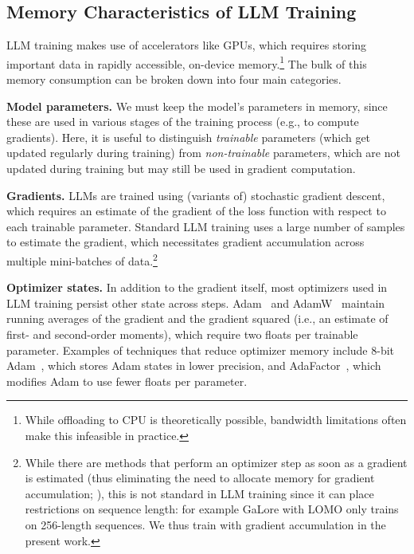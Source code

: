 \subsection{Memory Characteristics of LLM Training}
\vcram{-1mm}
\label{sec:memory-characteristics}

LLM training makes use of accelerators like GPUs, which requires  storing important data in rapidly accessible, on-device memory.\footnote{While offloading to CPU is theoretically possible, bandwidth limitations often make this infeasible in practice.}
The bulk of this memory consumption can be broken down into four main categories.

\noindent\textbf{Model parameters.} 
We must keep the model's parameters in memory, since these are used in various stages of the training process (e.g., to compute gradients). 
Here, it is useful to distinguish \emph{trainable} parameters (which get updated regularly during training) from \emph{non-trainable} parameters, which are not updated during training but may still be used in gradient computation. 


    
\noindent\textbf{Gradients.} 
LLMs are trained using (variants of) stochastic gradient descent, which requires an estimate of the gradient of the loss function with respect to each trainable parameter. 
Standard LLM training uses a large number of samples to estimate the gradient, which necessitates gradient accumulation across multiple mini-batches of data.\footnote{While there are methods that perform an optimizer step as soon as a gradient is estimated (thus eliminating the need to allocate memory for gradient accumulation; \citealp[e,g., LOMO,][]{lomo}), this is not standard in LLM training since it can place restrictions on sequence length: for example GaLore with LOMO only trains on 256-length sequences. We thus train with gradient accumulation in the present work.}




\noindent\textbf{Optimizer states.}
In addition to the gradient itself, most optimizers used in LLM training persist other state across steps. Adam~\citep{adam} and AdamW~\citep{adamw} maintain running averages of the gradient and the gradient squared (i.e., an estimate of first- and second-order  moments), which require two floats per trainable parameter. 
Examples of techniques that reduce optimizer memory include 8-bit Adam~\citep{adam8bit}, which stores Adam states in lower precision, and AdaFactor~\citep{adafactor}, which modifies Adam to use fewer floats per parameter.
    
